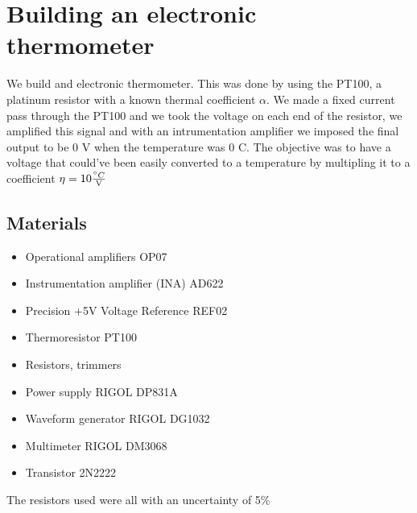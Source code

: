 \chapter{Building an electronic thermometer}
We build and electronic thermometer. This was done by using the PT100, a platinum resistor with a known thermal coefficient $\alpha$. We made a fixed current pass through the PT100 and we took the voltage on each end of the resistor, we amplified this signal and with an intrumentation amplifier we imposed the final output to be 0 V when the temperature was 0 \degree C. The objective was to have a voltage that could've been easily converted to a temperature by multipling it to a coefficient $\eta = 10 \frac{\degree C}{\text{V}}$


\section{Materials}
\begin{itemize}
\item Operational amplifiers OP07
\item Instrumentation amplifier (INA) AD622
\item Precision +5V Voltage Reference REF02
\item Thermoresistor PT100
\item Resistors, trimmers
\item Power supply RIGOL DP831A
\item Waveform generator RIGOL DG1032
\item Multimeter RIGOL DM3068
\item Transistor 2N2222
\end{itemize}
The resistors used were all with an uncertainty of 5\%
